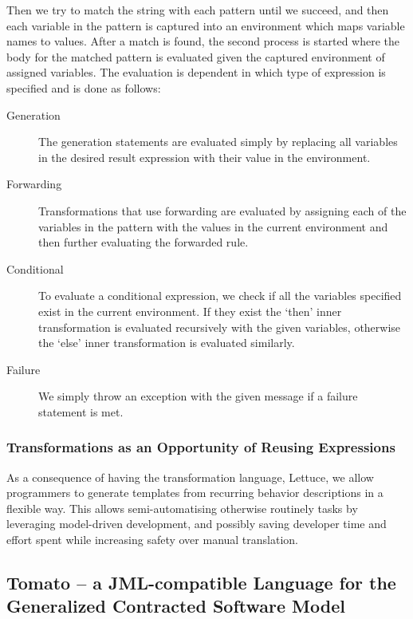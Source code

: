 Then we try to match the string with each pattern until we succeed,
and then each variable in the pattern is captured into an environment
which maps variable names to values.
After a match is found, the second process is started where the body
for the matched pattern is evaluated given the captured environment of assigned variables.
The evaluation is dependent in which type of expression is specified
and is done as follows:

\begin{description}
  \item[Generation] The generation statements are evaluated simply
    by replacing all variables in the desired result expression with their 
    value in the environment. 
  \item[Forwarding] Transformations that use forwarding are evaluated by
    assigning each of the variables in the pattern with the values in the
    current environment and then further evaluating the forwarded rule.
  \item[Conditional] To evaluate a conditional expression, we check if all
    the variables specified exist in the current environment.
    If they exist the `then' inner transformation is evaluated recursively
    with the given variables, otherwise the `else' inner transformation
    is evaluated similarly.
  \item[Failure] We simply throw an exception with the given message
    if a failure statement is met.
\end{description}

\subsubsection{Transformations as an Opportunity of Reusing Expressions}
\label{ssub:TransformationsasanOppurtunityofReusingExpressions}
As a consequence of having the transformation language, Lettuce,
we allow programmers to generate templates from recurring behavior descriptions in a flexible way. This allows semi-automatising otherwise 
routinely tasks by leveraging model-driven development, and possibly saving developer time and effort spent while increasing safety over manual
translation.


\subsection{Tomato -- a JML-compatible Language for the Generalized Contracted Software Model}
\label{sub:Tomato-aJML-compatibleLanguagefortheGeneralizedContractedSoftwareModel}


